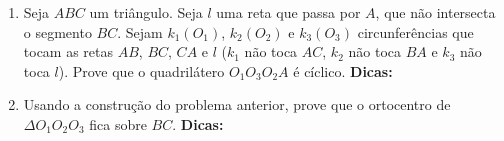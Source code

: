 \documentclass{article}
\newcommand{\dica}{\textbf{Dicas:}}
\newcommand{\iniTri}{Seja $ABC$ um triângulo}
\begin{document}
\begin{multicols}{2}
\begin{enumerate}
    \item \iniTri. Seja $l$ uma reta que passa por $A$, que não intersecta o segmento $BC$. Sejam $k_1(O_1)$, $k_2(O_2)$ e $k_3(O_3)$ circunferências que tocam as retas $AB$, $BC$, $CA$ e $l$ ($k_1$ não toca $AC$, $k_2$ não toca $BA$ e $k_3$ não toca $l$). Prove que o quadrilátero $O_1O_3O_2A$ é cíclico. \dica %
    
    \item Usando a construção do problema anterior, prove que o ortocentro de $\Delta O_1O_2O_3$ fica sobre $BC$. \dica %
    
    
    
    
    
    
    
    
    
    
    
    
    
\end{enumerate}
\end{multicols}
\end{document}
